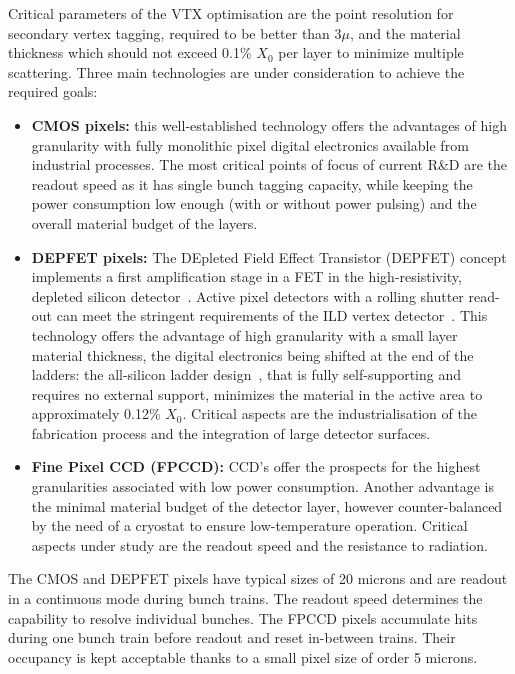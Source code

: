 Critical parameters of the VTX optimisation are the point resolution for secondary vertex tagging, required to be better than 3$\mu$, and the material thickness which should not exceed 0.1\% $X_0$ per layer to minimize multiple scattering. Three main technologies are under consideration to achieve the required goals:
\begin{itemize}
    \item {\bf CMOS pixels:} this well-established technology offers the advantages of high granularity with fully monolithic pixel digital electronics available from industrial processes. The most critical points of focus of current R\&D are the readout speed as it has single bunch tagging capacity, while keeping the power consumption low enough (with or without power pulsing) and the overall material budget of the layers.
    \item {\bf DEPFET pixels:} The DEpleted Field Effect Transistor (DEPFET) concept implements a first amplification stage in a FET in the high-resistivity, depleted silicon detector~\cite{}. Active pixel detectors with a rolling shutter read-out can meet the stringent requirements of the ILD vertex detector~\cite{Alonso:2012ss,Richter:2003dn}. This technology offers the advantage of high granularity with a small layer material thickness, the digital electronics being shifted at the end of the ladders: the all-silicon ladder design~\cite{Andricek:2004cj}, that is fully self-supporting and requires no external support, minimizes the material in the active area to approximately 0.12\% $X_{0}$. Critical aspects are the industrialisation of the fabrication process and the integration of large detector surfaces.
    \item{\bf Fine Pixel CCD (FPCCD):} CCD's offer the prospects for the highest granularities associated with low power consumption. Another advantage is the minimal material budget of the detector layer, however counter-balanced by the need of a cryostat to ensure low-temperature operation. Critical aspects under study are the readout speed and the resistance to radiation.  
\end{itemize}

\vspace{0.5cm}
The CMOS and DEPFET pixels have typical sizes of 20 microns and are readout in a continuous mode during bunch trains. The readout speed determines the capability to resolve individual bunches. The FPCCD pixels accumulate hits during one bunch train before readout and reset in-between trains. Their occupancy is kept acceptable thanks to a small pixel size of order 5 microns.  


